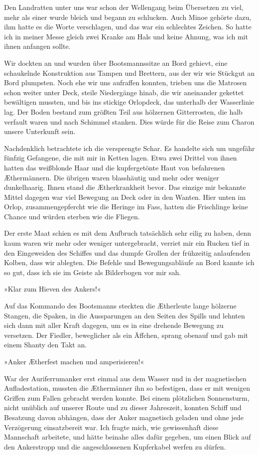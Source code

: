 Den Landratten unter uns war schon der Wellengang beim Übersetzen
zu viel, mehr als einer wurde bleich und begann zu schlucken. Auch
Minoe gehörte dazu, ihm hatte es die Worte verschlagen, und das war
ein schlechtes Zeichen. So hatte ich in meiner Messe gleich zwei
Kranke am Hals und keine Ahnung, was ich mit ihnen anfangen
sollte.

Wir dockten an und wurden über Bootsmannssitze an Bord gehievt,
eine schaukelnde Konstruktion aus Tampen und Brettern, aus der wir
wie Stückgut an Bord plumpsten. Noch ehe wir uns aufraffen konnten,
trieben uns die Matrosen schon weiter unter Deck, steile
Niedergänge hinab, die wir aneinander gekettet bewältigen mussten,
und bis ins stickige Orlopdeck, das unterhalb der Wasserlinie lag.
Der Boden bestand zum größten Teil aus hölzernen Gitterrosten, die
halb verfault waren und nach Schimmel stanken. Dies würde für die
Reise zum Charon unsere Unterkunft sein.

Nachdenklich betrachtete ich die versprengte Schar. Es handelte
sich um ungefähr fünfzig Gefangene, die mit mir in Ketten lagen.
Etwa zwei Drittel von ihnen hatten das weißblonde Haar und die
kupfergetönte Haut von befahrenen Æthermännern. Die übrigen waren
blasshäutig und mehr oder weniger dunkelhaarig. Ihnen stand die
Ætherkrankheit bevor. Das einzige mir bekannte Mittel dagegen war
viel Bewegung an Deck oder in den Wanten. Hier unten im Orlop,
zusammengepfercht wie die Heringe im Fass, hatten die Frischlinge
keine Chance und würden sterben wie die Fliegen.

\bigpar

Der erste Maat schien es mit dem Aufbruch tatsächlich sehr eilig zu
haben, denn kaum waren wir mehr oder weniger untergebracht, verriet
mir ein Rucken tief in den Eingeweiden des Schiffes und das dumpfe
Grollen der frühzeitig anlaufenden Kolben, dass wir ablegten. Die
Befehle und Bewegungsabläufe an Bord kannte ich so gut, dass ich
sie im Geiste als Bilderbogen vor mir sah.

»Klar zum Hieven des Ankers!«

Auf das Kommando des Bootsmanns steckten die Ætherleute lange
hölzerne Stangen, die Spaken, in die Aussparungen an den Seiten des
Spills und lehnten sich dann mit aller Kraft dagegen, um es in eine
drehende Bewegung zu versetzen. Der Fiedler, beweglicher als ein
Äffchen, sprang obenauf und gab mit einem Shanty den Takt an.

»Anker Ætherfest machen und amperisieren!«

War der Auriferrumanker erst einmal aus dem Wasser und in der
magnetischen Aufladestation, mussten die Æthermänner ihn so
befestigen, dass er mit wenigen Griffen zum Fallen gebracht werden
konnte. Bei einem plötzlichen Sonnensturm, nicht unüblich auf
unserer Route und zu dieser Jahreszeit, konnten Schiff und
Besatzung davon abhängen, dass der Anker magnetisch geladen und
ohne jede Verzögerung einsatzbereit war. Ich fragte mich, wie
gewissenhaft diese Mannschaft arbeitete, und hätte beinahe alles
dafür gegeben, um einen Blick auf den Ankerstropp und die
angeschlossenen Kupferkabel werfen zu dürfen.

